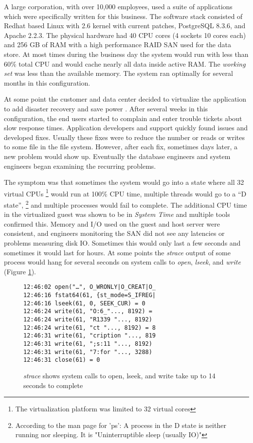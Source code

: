 A large corporation, with over 10,000 employees, used a suite of applications which were specifically written for this business. The software stack consisted of Redhat based Linux with 2.6 kernel with current patches, PostgreSQL 8.3.6, and Apache 2.2.3.  The physical hardware had 40 CPU cores (4 sockets 10 cores each) and 256 GB of RAM with a high performance RAID SAN used for the data store.  At most times during the business day the system would run with less than 60\% total CPU and would cache nearly all data inside active RAM.  The \emph{working set} was less than the available memory.  The system ran optimally for several months in this configuration.

\indent At some point the customer and data center decided to virtualize the application to add disaster recovery \cite{wood} and save power \cite{lim}.  After several weeks in this configuration, the end users started to complain and enter trouble tickets about slow response times.  Application developers and support quickly found issues and developed fixes.   Usually these fixes were to reduce the number or reads or writes to some file in the file system.  However, after each fix, sometimes days later, a new problem would show up.  Eventually the database engineers and system engineers began examining the recurring problems.

\indent The symptom was that sometimes the system would go into a state where all 32 virtual CPUs \footnote{The virtualization platform was limited to 32 virtual cores} would run at 100\% CPU time, multiple threads would go to a “D state”, \footnote{According to the man page for 'ps':  A process in the D state is neither running nor sleeping.  It is "Uninterruptible sleep (usually IO)"} and multiple processes would fail to complete.  The additional CPU time in the virtualized guest was shown to be in \emph{System Time} and multiple tools confirmed this.  Memory and I/O used on the guest and host server were consistent, and engineers monitoring the SAN did not see any latencies or problems measuring disk IO.  Sometimes this would only last a few seconds and sometimes it would last for hours. At some points the \emph{strace} output of some process would hang for several seconds on system calls to \emph{open}, \emph{lseek}, and \emph{write} (Figure \ref{fig:syscall}).

\begin{figure}[h]
\begin{Verbatim}
12:46:02 open("…", O_WRONLY|O_CREAT|O_
12:46:16 fstat64(61, {st_mode=S_IFREG| 
12:46:16 lseek(61, 0, SEEK_CUR) = 0 
12:46:24 write(61, "O:6_"..., 8192) =  
12:46:24 write(61, "R1339 "..., 8192)  
12:46:24 write(61, "ct "..., 8192) = 8 
12:46:31 write(61, "cription "..., 819  
12:46:31 write(61, ";s:11 "..., 8192)  
12:46:31 write(61, "7:for "..., 3288)  
12:46:31 close(61) = 0
\end{Verbatim}
\caption{\emph{strace} shows system calls to open, lseek, and write take up to 14 seconds to complete}
\label{fig:syscall}
\end{figure}

